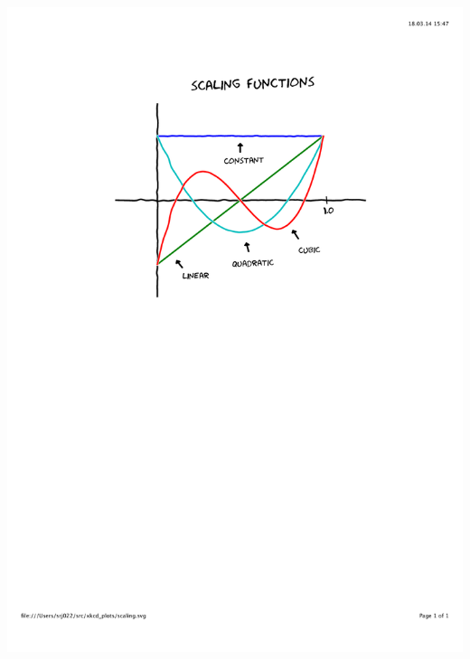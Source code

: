 \begin{frame}
\begin{columns}
\begin{column}[b]{0.45\linewidth}
\centering
\includegraphics[scale=0.3, clip, viewport=150 450 450 750]
    {figures/scaling.pdf}\\

\end{column}
\end{columns}
\end{frame}
